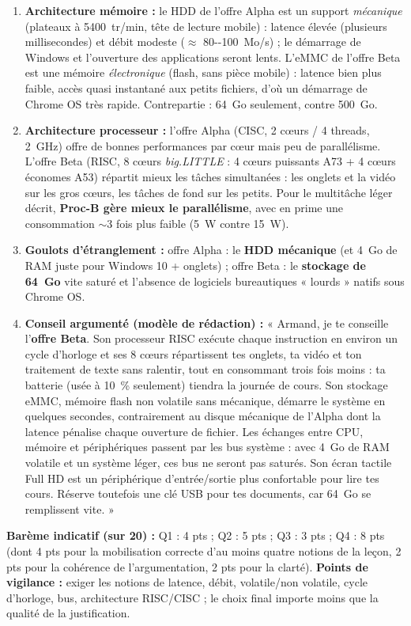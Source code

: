 \documentclass[11pt]{article}
\begin{document}
\begin{corrige}
\begin{enumerate}
    \item \textbf{Architecture mémoire :} le HDD de l'offre Alpha est un support \emph{mécanique} (plateaux à \SI{5400}{tr/min}, tête de lecture mobile) : latence élevée (plusieurs millisecondes) et débit modeste ($\approx$ \SI{80--100}{Mo/s}) ; le démarrage de Windows et l'ouverture des applications seront lents. L'eMMC de l'offre Beta est une mémoire \emph{électronique} (flash, sans pièce mobile) : latence bien plus faible, accès quasi instantané aux petits fichiers, d'où un démarrage de Chrome OS très rapide. Contrepartie : \SI{64}{Go} seulement, contre \SI{500}{Go}.
    \item \textbf{Architecture processeur :} l'offre Alpha (CISC, 2 cœurs / 4 threads, \SI{2}{GHz}) offre de bonnes performances par cœur mais peu de parallélisme. L'offre Beta (RISC, 8 cœurs \emph{big.LITTLE} : 4 cœurs puissants A73 + 4 cœurs économes A53) répartit mieux les tâches simultanées : les onglets et la vidéo sur les gros cœurs, les tâches de fond sur les petits. Pour le multitâche léger décrit, \textbf{Proc-B gère mieux le parallélisme}, avec en prime une consommation $\sim$3 fois plus faible (\SI{5}{W} contre \SI{15}{W}).
    \item \textbf{Goulots d'étranglement :} offre Alpha : le \textbf{HDD mécanique} (et \SI{4}{Go} de RAM juste pour Windows 10 + onglets) ; offre Beta : le \textbf{stockage de \SI{64}{Go}} vite saturé et l'absence de logiciels bureautiques « lourds » natifs sous Chrome OS.
    \item \textbf{Conseil argumenté (modèle de rédaction) :} « Armand, je te conseille l'\textbf{offre Beta}. Son processeur RISC exécute chaque instruction en environ un cycle d'horloge et ses 8 cœurs répartissent tes onglets, ta vidéo et ton traitement de texte sans ralentir, tout en consommant trois fois moins : ta batterie (usée à \SI{10}{\%} seulement) tiendra la journée de cours. Son stockage eMMC, mémoire flash non volatile sans mécanique, démarre le système en quelques secondes, contrairement au disque mécanique de l'Alpha dont la latence pénalise chaque ouverture de fichier. Les échanges entre CPU, mémoire et périphériques passent par les bus système : avec \SI{4}{Go} de RAM volatile et un système léger, ces bus ne seront pas saturés. Son écran tactile Full HD est un périphérique d'entrée/sortie plus confortable pour lire tes cours. Réserve toutefois une clé USB pour tes documents, car \SI{64}{Go} se remplissent vite. »
\end{enumerate}
\textbf{Barème indicatif (sur 20) :} Q1 : 4 pts ; Q2 : 5 pts ; Q3 : 3 pts ; Q4 : 8 pts (dont 4 pts pour la mobilisation correcte d'au moins quatre notions de la leçon, 2 pts pour la cohérence de l'argumentation, 2 pts pour la clarté).
\textbf{Points de vigilance :} exiger les notions de latence, débit, volatile/non volatile, cycle d'horloge, bus, architecture RISC/CISC ; le choix final importe moins que la qualité de la justification.
\end{corrige}
\end{document}
